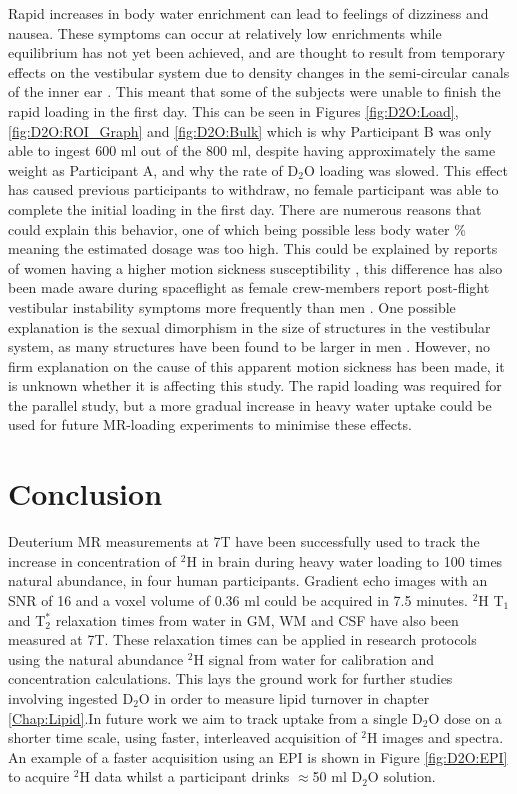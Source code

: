 \documentclass[class=article, crop=false]{standalone}
\begin{document}
Rapid increases in body water enrichment can lead to feelings of dizziness and nausea. These symptoms can occur at relatively low enrichments while equilibrium has not yet been achieved, and are thought to result from temporary effects on the vestibular system due to density changes in the semi-circular canals of the inner ear \cite{Money1974HeavyAlcohol}. This meant that some of the subjects were unable to finish the rapid loading in the first day. This can be seen in Figures \ref{fig:D2O:Load}, \ref{fig:D2O:ROI_Graph} and \ref{fig:D2O:Bulk} which is why Participant B was only able to ingest 600 ml out of the 800 ml, despite having approximately the same weight as Participant A, and why the rate of D$_2$O loading was slowed. This effect has caused previous participants to withdraw, no female participant was able to complete the initial loading in the first day. There are numerous reasons that could explain this behavior, one of which being possible less body water \% meaning the estimated dosage was too high. This could be explained by reports of women having a higher motion sickness susceptibility \cite{Flanagan2005SexSickness.}, this difference has also been made aware during spaceflight as female crew-members report post-flight vestibular instability symptoms more frequently than men \cite{Reschke2014EffectsSystems}. One possible explanation is the sexual dimorphism in the size of structures in the vestibular system, as many structures have been found to be larger in men \cite{Sato2016Computer-AidedApparatus}. However, no firm explanation on the cause of this apparent motion sickness has been made, it is unknown whether it is affecting this study. The rapid loading was required for the parallel study, but a more gradual increase in heavy water uptake could be used for future MR-loading experiments to minimise these effects. 

\section{Conclusion}

Deuterium MR measurements at 7T have been successfully used to track the increase in concentration of $^2$H in brain during heavy water loading to 100 times natural abundance, in four human participants. Gradient echo images with an SNR of 16 and a voxel volume of 0.36 ml could be acquired in 7.5 minutes. $^2$H T$_1$ and T$_2^*$ relaxation times from water in GM, WM and CSF have also been measured at 7T. These relaxation times can be applied in research protocols using the natural abundance $^2$H signal from water for calibration and concentration calculations. This lays the ground work for further studies involving ingested D$_2$O in order to measure lipid turnover in chapter \ref{Chap:Lipid}.In future work we aim to track uptake from a single D$_2$O dose on a shorter time scale, using faster, interleaved acquisition of $^2$H images and spectra. An example of a faster acquisition using an EPI is shown in Figure \ref{fig:D2O:EPI} to acquire $^2$H data whilst a participant drinks $\approx$50 ml D$_2$O solution.
\end{document}
